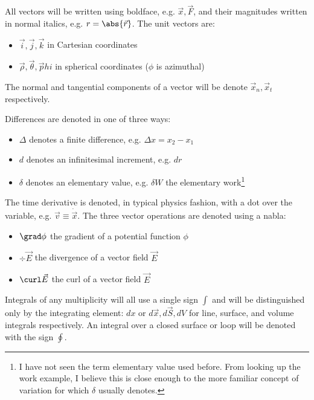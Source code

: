 \documentclass[12pt]{article}
\begin{document}
All vectors will be written using boldface, e.g. $\vec x, \vec F$, and their magnitudes written in normal italics, e.g. $r = \abs{\vec r}$. The unit vectors are:
\begin{itemize}
	\item $\vec i, \vec j, \vec k$ in Cartesian coordinates
	\item $\vec \rho, \vec \theta, \vec phi$ in spherical coordinates ($\phi$ is azimuthal)
\end{itemize}
The normal and tangential components of a vector will be denote $\vec x_n, \vec x_t$ respectively. 

Differences are denoted in one of three ways:
\begin{itemize}
	\item $\Delta$ denotes a finite difference, e.g. $\Delta x = x_2 - x_1$
	\item $d$ denotes an infinitesimal increment, e.g. $dr$
	\item $\delta$ denotes an elementary value, e.g. $\delta W$ the elementary work\footnote{I have not seen the term elementary value used before. From looking up the work example, I believe this is close enough to the more familiar concept of variation for which $\delta$ usually denotes.}
\end{itemize}

The time derivative is denoted, in typical physics fashion, with a dot over the variable, e.g. $\vec v \equiv \dot{\vec x}$. The three vector operations are denoted using a nabla:
\begin{itemize}
	\item $\grad \phi$ the gradient of a potential function $\phi$
	\item $\div \vec E$ the divergence of a vector field $\vec E$
	\item $\curl \vec E$ the curl of a vector field $\vec E$
\end{itemize}

Integrals of any multiplicity will all use a single sign $\int$ and will be distinguished only by the integrating element: $dx$ or $d\vec x, d\vec S, dV$ for line, surface, and volume integrals respectively. An integral over a closed surface or loop will be denoted with the sign $\oint$.


% 
\end{document}
